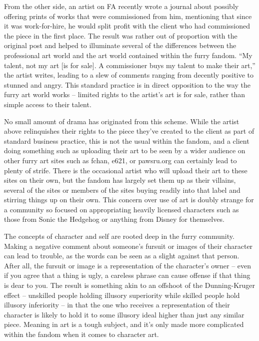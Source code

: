 From the other side, an artist on FA recently wrote a journal about possibly offering prints of works that were commissioned from him, mentioning that since it was work-for-hire, he would split profit with the client who had commissioned the piece in the first place.  The result was rather out of proportion with the original post and helped to illuminate several of the differences between the professional art world and the art world contained within the furry fandom.  “My talent, not my art [is for sale]. A commissioner buys my talent to make their art,” the artist writes, leading to a slew of comments ranging from decently positive to stunned and angry.  This standard practice is in direct opposition to the way the furry art world works -- limited rights to the artist's art is for sale, rather than simple access to their talent.

No small amount of drama has originated from this scheme.  While the artist above relinquishes their rights to the piece they've created to the client as part of standard business practice, this is not the usual within the fandom, and a client doing something such as uploading their art to be seen by a wider audience on other furry art sites such as fchan, e621, or pawsru.org can certainly lead to plenty of strife.  There is the occasional artist who will upload their art to these sites on their own, but the fandom has largely set them up as their villains, several of the sites or members of the sites buying readily into that label and stirring things up on their own.  This concern over use of art is doubly strange for a community so focused on appropriating heavily licensed characters such as those from Sonic the Hedgehog or anything from Disney for themselves.

The concepts of character and self are rooted deep in the furry community.  Making a negative comment about someone's fursuit or images of their character can lead to trouble, as the words can be seen as a slight against that person.  After all, the fursuit or image is a representation of the character's owner -- even if you agree that a thing is ugly, a careless phrase can cause offense if that thing is dear to you.  The result is something akin to an offshoot of the Dunning-Kruger effect -- unskilled people holding illusory superiority while skilled people hold illusory inferiority -- in that the one who receives a representation of their character is likely to hold it to some illusory ideal higher than just any similar piece.  Meaning in art is a tough subject, and it's only made more complicated within the fandom when it comes to character art.

